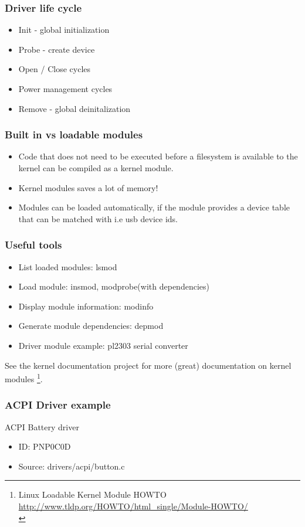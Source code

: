 \documentclass{beamer}
\begin{document}
\begin{frame}
\frametitle{Driver life cycle}
\begin{itemize}
	\item Init - global initialization
	\item Probe - create device
	\item Open / Close cycles
	\item Power management cycles
	\item Remove - global deinitalization
\end{itemize}
\end{frame}

\begin{frame}
\frametitle{Built in vs loadable modules}
\begin{itemize}
\item Code that does not need to be executed before a filesystem is available to the kernel can be compiled as a kernel module. \\
\item Kernel modules saves a lot of memory!
\item Modules can be loaded automatically, if the module provides a device table that can be matched with i.e usb device ids. \\
\end{itemize}
\end{frame}

\begin{frame}
\frametitle{Useful tools}
\begin{itemize}
	\item List loaded modules: lsmod
	\item Load module: insmod, modprobe(with dependencies)
	\item Display module information: modinfo
	\item Generate module dependencies: depmod
	\item Driver module example: pl2303 serial converter\\
\end{itemize}
See the kernel documentation project for more (great) documentation on kernel modules \footnote{Linux Loadable Kernel Module HOWTO \url{http://www.tldp.org/HOWTO/html\_single/Module-HOWTO/}\\}.
\end{frame}

\begin{frame}
\frametitle{ACPI Driver example}
ACPI Battery driver
\begin{itemize}
	\item ID: PNP0C0D
	\item Source: drivers/acpi/button.c
\end{itemize}
\end{frame}
\end{document}
